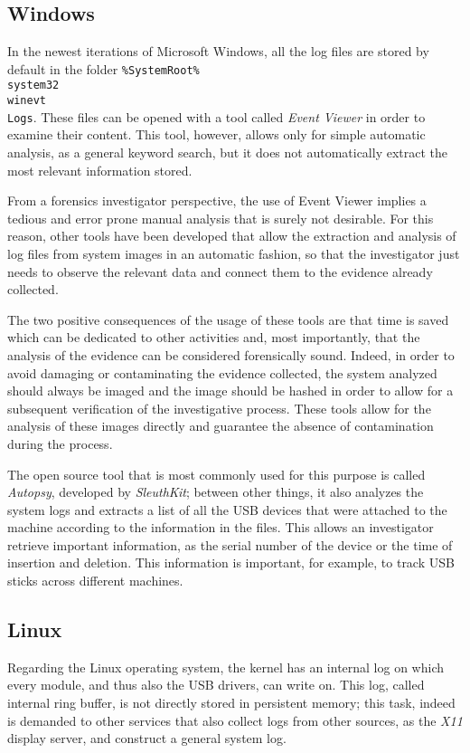 \documentclass[a4paper]{article}
\begin{document}
\subsection{Windows}\label{sec:litWindows}
In the newest iterations of Microsoft Windows, all the log files are stored by
default in the folder \texttt{\%SystemRoot\%\\system32\\winevt\\Logs}. These
files can be opened with a tool called \emph{Event Viewer} in order to examine
their content. This tool, however, allows only for simple automatic analysis, as
a general keyword search, but it does not automatically extract the most
relevant information stored.

From a forensics investigator perspective, the use of Event Viewer implies a
tedious and error prone manual analysis that is surely not desirable. For this
reason, other tools have been developed that allow the extraction and analysis
of log files from system images in an automatic fashion, so that the
investigator just needs to observe the relevant data and connect them to the
evidence already collected.

The two positive consequences of the usage of these tools are that time is saved
which can be dedicated to other activities and, most importantly, that the
analysis of the evidence can be considered forensically sound. Indeed, in order
to avoid damaging or contaminating the evidence collected, the system analyzed
should always be imaged and the image should be hashed in order to allow for a
subsequent verification of the investigative process. These tools allow for the
analysis of these images directly and guarantee the absence of contamination
during the process.~\cite{murphey2007automated}

The open source tool that is most commonly used for this purpose is called
\emph{Autopsy}, developed by \emph{SleuthKit}; between other things, it also
analyzes the system logs and extracts a list of all the USB devices that were
attached to the machine according to the information in the files. This allows
an investigator retrieve important information, as the serial number of the
device or the time of insertion and deletion. This information is important, for
example, to track USB sticks across different machines.~\cite{deb2015usb}

\subsection{Linux}
Regarding the Linux operating system, the kernel has an internal log on which
every module, and thus also the USB drivers, can write on. This log, called
internal ring buffer, is not directly stored in persistent memory; this task,
indeed is demanded to other services that also collect logs from other sources,
as the \emph{X11} display server, and construct a general system log.
\end{document}
